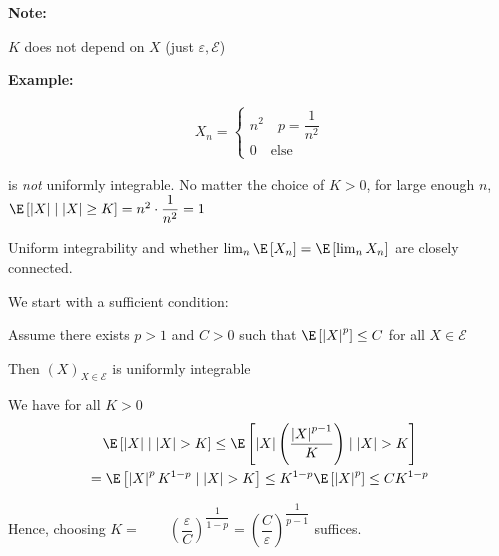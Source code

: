 \par\bigskip
\noindent\textbf{Note:}\par
\noindent $K$ does not depend on $X$ (just $\varepsilon,\mathcal{E}$)
\par\bigskip
\noindent\textbf{Example:}\par
\begin{equation*}
  \begin{gathered}
    X_n = \begin{cases}
      n^2\quad p=\dfrac{1}{n^2}\\0\quad\text{else}
    \end{cases}
  \end{gathered}
\end{equation*}\par
\noindent is \textit{not} uniformly integrable. No matter the choice of $K>0$, for large enough $n$, $\E\left[\left|X\right|\mid \left|X\right|\geq K\right] = n^2\cdot\dfrac{1}{n^2} = 1$
\par\bigskip
\noindent Uniform integrability and whether $\lim_{n}\E\left[X_n\right]=\E\left[\lim_{n}X_n\right]$ are closely connected.
\par\bigskip
\noindent We start with a sufficient condition:
\par\bigskip
\begin{lem}[]{}
  Assume there exists $p>1$ and $C>0$ such that $\E\left[\left|X\right|^p\right]\leq C$ for all $X\in\mathcal{E}$\par
  \noindent Then $(X)_{X\in\mathcal{E}}$ is uniformly integrable
\end{lem}
\par\bigskip
\begin{prf}[]{}
  We have for all $K>0$
  \begin{equation*}
    \begin{gathered}
      \E\left[\left|X\right|\mid\left|X\right|>K\right]\leq\E\left[\left|X\right|\left(\dfrac{\left|X\right|^{p-1}}{K}\right)\mid\left|X\right|>K\right]\\
      =\E\left[\left|X\right|^pK^{1-p}\mid\left|X\right|>K\right]\leq K^{1-p}\E\left[\left|X\right|^p\right]\leq CK^{1-p}
    \end{gathered}
  \end{equation*}
  \par\bigskip
  \noindent Hence, choosing $K =\qquad\left(\dfrac{\varepsilon}{C}\right)^{\dfrac{1}{1-p}} = \left(\dfrac{C}{\varepsilon}\right)^{\dfrac{1}{p-1}}$ suffices.
\end{prf}
\par\bigskip
